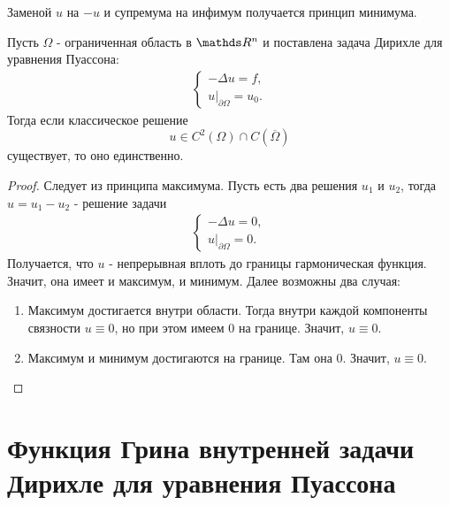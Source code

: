 \begin{note} Заменой $u$ на $-u$ и супремума на инфимум получается принцип минимума.
\end{note}

\begin{corollary} Пусть $\Omega$ - ограниченная область в $\real^n$ и поставлена задача Дирихле для уравнения Пуассона:
\begin{align*}
	\begin{cases*}
		- \Delta u = f,\\
		u\Big\rvert_{\partial \Omega} = u_0.
	\end{cases*}
\end{align*}
Тогда если классическое решение
$$ u \in C^2(\Omega) \cap C(\overline{\Omega})$$
существует, то оно единственно.
\end{corollary}
\begin{proof}
Следует из принципа максимума. Пусть есть два решения $u_1$ и $u_2$, тогда $u = u_1 - u_2$ - решение задачи
\begin{align*}
	\begin{cases*}
		- \Delta u = 0,\\
		u\Big\rvert_{\partial \Omega} = 0.
	\end{cases*}
\end{align*}
Получается, что $u$ - непрерывная вплоть до границы гармоническая функция. Значит, она имеет и максимум, и минимум. Далее возможны два случая:
\begin{enumerate}
\item Максимум достигается внутри области. Тогда внутри каждой компоненты связности $u \equiv 0$, но при этом имеем $0$ на границе. Значит, $u \equiv 0$.
\item Максимум и минимум достигаются на границе. Там она $0$. Значит, $u \equiv 0$.
\end{enumerate}
\end{proof}

\section{Функция Грина внутренней задачи Дирихле для уравнения Пуассона}

